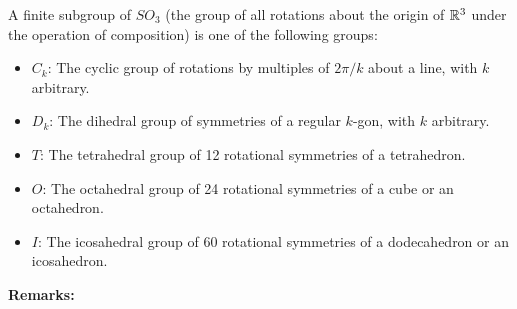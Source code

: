 \documentclass[letterpaper]{article}
\begin{document}
\begin{theorem}{}{}
    A finite subgroup of $SO_3$ (the group of all rotations about the origin of $\mathbb{R}^3$ under the operation of composition) is one of the following groups: 
    \begin{itemize}
        \item $C_k$: The cyclic group of rotations by multiples of $2\pi / k$ about a line, with $k$ arbitrary. 
        \item $D_k$: The dihedral group of symmetries of a regular $k$-gon, with $k$ arbitrary.
        \item $T$: The tetrahedral group of 12 rotational symmetries of a tetrahedron.
        \item $O$: The octahedral group of 24 rotational symmetries of a cube or an octahedron. 
        \item $I$: The icosahedral group of 60 rotational symmetries of a dodecahedron or an icosahedron.  
    \end{itemize}
\end{theorem}
\textbf{Remarks:}
\end{document}
